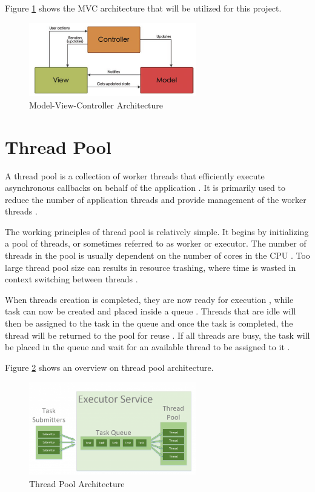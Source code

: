 Figure \ref{fig:mvc} shows the MVC architecture that will be utilized for this project.

\begin{figure}[!ht]
	\centering
	\includegraphics[width=0.65\textwidth]{texs/Part2/chapter1/image/mvc.png}
	\caption{Model-View-Controller Architecture \cite[46]{Garca2023}}
	\label{fig:mvc}
\end{figure}

\section{Thread Pool}
\label{sec:thread-pool}

A thread pool is a collection of worker threads that efficiently execute asynchronous callbacks on behalf of the application \cite{Karl-Bridge-Microsoft}. It is primarily used to reduce the number of application threads and provide management of the worker threads \cite{Karl-Bridge-Microsoft}.

The working principles of thread pool is relatively simple. It begins by initializing a pool of threads, or sometimes referred to as worker or executor. The number of threads in the pool is usually dependent on the number of cores in the CPU \cite{GeekforGeek_2020}. Too large thread pool size can results in resource trashing, where time is wasted in context switching between threads \cite{GeekforGeek_2020}.

When threads creation is completed, they are now ready for execution , while task can now be created and placed inside a queue \cite{GeekforGeek_2020}. Threads that are idle will then be assigned to the task in the queue and once the task is completed, the thread will be returned to the pool for reuse \cite{GeekforGeek_2020}. If all threads are busy, the task will be placed in the queue and wait for an available thread to be assigned to it \cite{GeekforGeek_2020}.

Figure \ref{fig:thread-pool} shows an overview on thread pool architecture.

\begin{figure}[!ht]
	\centering
	\includegraphics[width=0.65\textwidth]{texs/Part2/chapter1/image/threadpool.png}
	\caption{Thread Pool Architecture \cite{Paraschiv_2023}}
	\label{fig:thread-pool}
\end{figure}